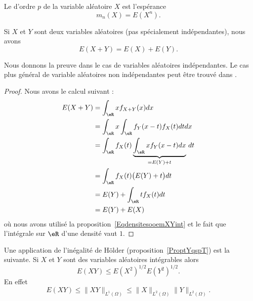 Le  d'ordre \( p\) de la variable aléatoire \( X\) est l'espérance
\begin{equation}
    m_n(X)=E(X^n).
\end{equation}

\begin{proposition} \label{PropZBnsCgh}
    Si \( X\) et \( Y\) sont deux variables aléatoires (pas spécialement indépendantes), nous avons
    \begin{equation}
        E(X+Y)=E(X)+E(Y).
    \end{equation}
\end{proposition}

Nous donnons la preuve dans le cas de variables aléatoires indépendantes. Le cas plus général de variable aléatoires non indépendantes peut être trouvé dans \cite{Marazzi}.
\begin{proof}
    Nous avons le calcul suivant :
    \begin{subequations}
        \begin{align}
            E(X+Y)&=\int_{\eR}xf_{X+Y}(x)dx\\
            &=\int_{\eR}x\int_{\eR}f_Y(x-t)f_X(t)dtdx\\
            &=\int_{\eR}f_X(t)\underbrace{\int_{\eR}xf_Y(x-t)dx}_{=E(Y)+t}\,dt\\
            &=\int_{\eR}f_X(t)\big( E(Y)+t \big)dt\\
            &=E(Y)+\int_{\eR}tf_X(t)dt\\
            &=E(Y)+E(X)
        \end{align}
    \end{subequations}
    où nous avons utilisé la proposition~\ref{EqdensitesooemXYint} et le fait que l'intégrale sur \( \eR\) d'une densité vaut \( 1\).
\end{proof}

Une application de l'inégalité de Hölder (proposition~\ref{ProptYqspT}) est la suivante. Si \( X\) et \( Y\) sont des variables aléatoires intégrables alors
\begin{equation}
    E(XY)\leq E(X^2)^{1/2}E(Y^2)^{1/2}.
\end{equation}
En effet
\begin{equation}    \label{EqEXYleqXdYdNormHolder}
    E(XY)\leq \| XY \|_{L^1(\Omega)}\leq \| X \|_{L^2(\Omega)}\| Y \|_{L^2(\Omega)}.
\end{equation}

